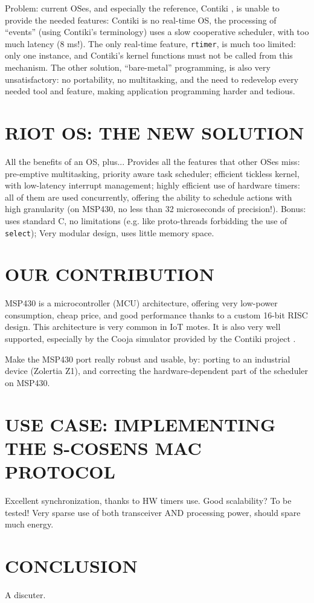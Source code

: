 \documentclass[a4paper,twoside]{article}
\begin{document}
Problem: current OSes, and especially the reference, Contiki \cite{Contiki},
is unable to provide the needed features: Contiki is no real-time OS,
the processing of ``events'' (using Contiki's terminology) uses a slow
cooperative scheduler, with too much latency (8 ms!).
The only real-time feature, \texttt{rtimer}, is much too limited: only one
instance, and Contiki's kernel functions must not be called from this
mechanism.
The other solution, ``bare-metal'' programming, is also very unsatisfactory:
no portability, no multitasking, and the need to redevelop every needed tool
and feature,  making application programming harder and tedious.

\section{\uppercase{RIOT OS: the new solution}}

All the benefits of an OS, plus...
Provides all the features that other OSes miss:
pre-emptive multitasking, priority aware task scheduler;
efficient tickless kernel, with low-latency interrupt management;
highly efficient use of hardware timers: all of them are used concurrently,
offering the ability to schedule actions with high granularity (on MSP430,
no less than 32 microseconds of precision!).
Bonus: uses standard C, no limitations (e.g. like proto-threads forbidding
the use of \texttt{select});
Very modular design, uses little memory space.

\section{\uppercase{Our contribution}}

MSP430 is a microcontroller (MCU) architecture, offering very low-power
consumption, cheap price, and good performance thanks to a custom 16-bit
RISC design. This architecture is very common in IoT motes.
It is also very well supported, especially by the Cooja simulator
provided by the Contiki project \cite{Contiki}.

Make the MSP430 port really robust and usable, by:
porting to an industrial device (Zolertia Z1), and
correcting the hardware-dependent part of the scheduler on MSP430.

\section{\uppercase{Use Case: implementing the S-CoSenS MAC protocol}}

Excellent synchronization, thanks to HW timers use.
Good scalability? To be tested!
Very sparse use of both transceiver AND processing power, should spare much energy.

\section{\uppercase{Conclusion}}

A discuter.

\vfill

{\small
}
\end{document}
